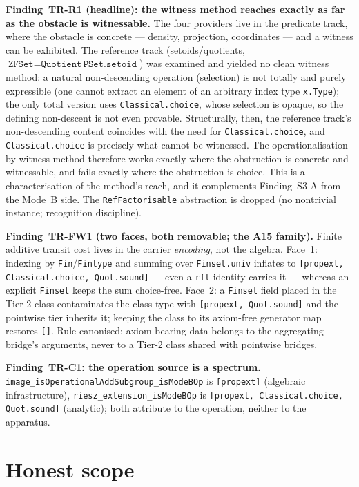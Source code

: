 \textbf{Finding~TR-R1 (headline): the witness method reaches exactly as far as the
obstacle is witnessable.}  The four providers live in the predicate track, where
the obstacle is concrete --- density, projection, coordinates --- and a witness can
be exhibited.  The reference track (setoids/quotients, $\texttt{ZFSet} =
\texttt{Quotient}\,\texttt{PSet.setoid}$) was examined and yielded no clean witness
method: a natural non-descending operation (selection) is not totally and purely
expressible (one cannot extract an element of an arbitrary index type
\texttt{x.Type}); the only total version uses \texttt{Classical.choice}, whose
selection is opaque, so the defining non-descent is not even provable.  Structurally,
then, the reference track's non-descending content coincides with the need for
\texttt{Classical.choice}, and \texttt{Classical.choice} is precisely what cannot be
witnessed.  The operationalisation-by-witness method
therefore works exactly where the obstruction is concrete and witnessable, and fails
exactly where the obstruction is choice.  This is a characterisation of the method's
reach, and it complements Finding~S3-A from the Mode~B side.  The \texttt{RefFactorisable}
abstraction is dropped (no nontrivial instance; recognition discipline).

\textbf{Finding~TR-FW1 (two faces, both removable; the A15 family).}  Finite
additive transit cost lives in the carrier \emph{encoding}, not the algebra.
Face~1: indexing by \texttt{Fin}/\texttt{Fintype} and summing over
\texttt{Finset.univ} inflates to \texttt{[propext, Classical.choice, Quot.sound]} ---
even a \texttt{rfl} identity carries it --- whereas an explicit \texttt{Finset} keeps
the sum choice-free.  Face~2: a \texttt{Finset} field placed in the Tier-2 class
contaminates the class type with \texttt{[propext, Quot.sound]} and the pointwise tier
inherits it; keeping the class to its axiom-free generator map restores \texttt{[]}.
Rule canonised: axiom-bearing data belongs to the aggregating bridge's arguments,
never to a Tier-2 class shared with pointwise bridges.

\textbf{Finding~TR-C1: the operation source is a spectrum.}
\texttt{image\_isOperationalAddSubgroup\_isModeBOp} is \texttt{[propext]} (algebraic
infrastructure), \texttt{riesz\_extension\_isModeBOp} is \texttt{[propext,
Classical.choice, Quot.sound]} (analytic); both attribute to the operation, neither
to the apparatus.

\section{Honest scope}
\label{sec:transit_scope}

